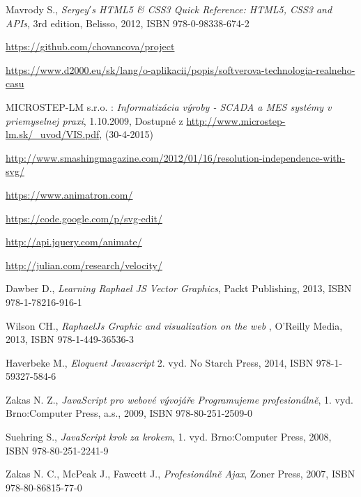 \begin{thebibliography}{99}                               
	 \label{literatura}


 Mavrody S.,
 {\it Sergey$'$s HTML5 \& CSS3 Quick Reference: HTML5, CSS3 and APIs},
 3rd edition, Belisso, 2012, ISBN  978-0-98338-674-2

\url{https://github.com/chovancova/project} 

\url{https://www.d2000.eu/sk/lang/o-aplikacii/popis/softverova-technologia-realneho-casu}

MICROSTEP-LM s.r.o. : 
{\it Informatizácia výroby - SCADA a MES systémy v priemyselnej praxi}, 1.10.2009, Dostupné z \url{http://www.microstep-lm.sk/_uvod/VIS.pdf}, (30-4-2015)


 \url{http://www.smashingmagazine.com/2012/01/16/resolution-independence-with-svg/}



  \url{https://www.animatron.com/}

 \url{https://code.google.com/p/svg-edit/}

 \url{http://api.jquery.com/animate/}

\url{http://julian.com/research/velocity/}

Dawber D.,
{\it Learning Raphael JS Vector Graphics}, 
 Packt Publishing, 2013, ISBN 978-1-78216-916-1
         
 
 
 Wilson CH., {\it RaphaelJs Graphic and visualization on the web} , 
O'Reilly Media, 2013, ISBN 978-1-449-36536-3
         

Haverbeke M., 
{\it Eloquent Javascript} 2. vyd. No Starch Press, 2014, ISBN 978-1-59327-584-6


Zakas N. Z., 
{\it JavaScript pro webové vývojáře Programujeme profesionálně},
 1. vyd. Brno:Computer Press, a.s., 2009,  ISBN 978-80-251-2509-0

Suehring S., 
{\it JavaScript krok za krokem},
1. vyd. Brno:Computer Press, 2008, ISBN 978-80-251-2241-9

Zakas N. C., McPeak J., Fawcett J.,
{\it Profesionálně Ajax},
Zoner Press, 2007,  ISBN 978-80-86815-77-0


\end{thebibliography}
